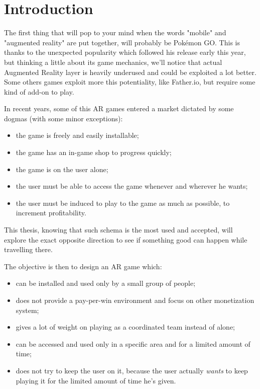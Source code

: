 \chapter{Introduction}
	
	The first thing that will pop to your mind when the words "mobile" and "augmented reality" are put together, will probably be Pokémon GO. This is thanks to the unexpected popularity which followed his release early this year, but thinking a little about its game mechanics, we'll notice that actual Augmented Reality layer is heavily underused and could be exploited a lot better.
	Some others games exploit more this potentiality, like Father.io, but require some kind of add-on to play.
	
	In recent years, some of this AR games entered a market dictated by some dogmas (with some minor exceptions):
	\begin{itemize}
		\item the game is freely and easily installable;
		\item the game has an in-game shop to progress quickly;
		\item the game is on the user alone;
		\item the user must be able to access the game whenever and wherever he wants;
		\item the user must be induced to play to the game as much as possible, to increment profitability.
	\end{itemize}
	
	This thesis, knowing that such schema is the most used and accepted, will explore the exact opposite direction to see if something good can happen while travelling there.
	
	The objective is then to design an AR game which: 
	\begin{itemize}
		\item can be installed and used only by a small group of people;
		\item does not provide a pay-per-win environment and focus on other monetization system;
		\item gives a lot of weight on playing as a coordinated team instead of alone;
		\item can be accessed and used only in a specific area and for a limited amount of time;
		\item does not try to keep the user on it, because the user actually \emph{wants} to keep playing it for the limited amount of time he's given.
	\end{itemize}
	
